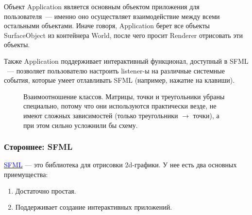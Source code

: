 \documentclass{article}
\begin{document}
Объект Application является основным объектом приложения для пользователя~--- именно оно осуществляет взаимодействие между всеми остальными объектами. Иначе говоря, Application берет все объекты SurfaceObject из контейнера World, после чего просит Renderer отрисовать эти объекты.

Также Application поддерживает интерактивный функционал, доступный в SFML ~--- позволяет пользователю настроить listener-ы на различные системные события, которые умеет отлавливать SFML (например, нажатие на клавиши).

\begin{center}
\begin{figure}[H]
\caption{Взаимоотношение классов. Матрицы, точки и треугольники убраны специально, потому что они используются практически везде, не имеют сложных зависимостей (только треугольники $\to$ точки), а при этом сильно усложнили бы схему. }
\label{ris:image}
\end{figure}
\end{center}

\subsubsection{Стороннее: SFML}

\href{https://www.sfml-dev.org/}{\textcolor{blue}{SFML}} --- это библиотека для отрисовки 2d-графики. У нее есть два основных приемущества:

\begin{enumerate}

\item Достаточно простая.
\item Поддерживает создание интерактивных приложений.

\end{enumerate}
\end{document}
